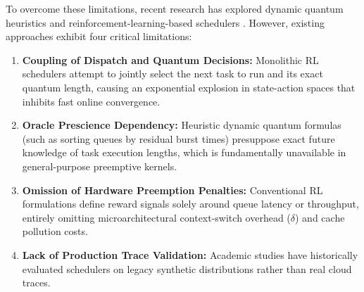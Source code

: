 \documentclass[journal]{IEEEtran}
\begin{document}
To overcome these limitations, recent research has explored dynamic quantum heuristics \cite{hasan2024enhanced, mehmood2023optimizing, ali2023dynamic} and reinforcement-learning-based schedulers \cite{li2024reinforcement, zhang2023deep, chen2023multi, kim2024adaptive}. However, existing approaches exhibit four critical limitations:
\begin{enumerate}
    \item \textbf{Coupling of Dispatch and Quantum Decisions:} Monolithic RL schedulers attempt to jointly select the next task to run and its exact quantum length, causing an exponential explosion in state-action spaces that inhibits fast online convergence.
    \item \textbf{Oracle Prescience Dependency:} Heuristic dynamic quantum formulas (such as sorting queues by residual burst times) presuppose exact future knowledge of task execution lengths, which is fundamentally unavailable in general-purpose preemptive kernels.
    \item \textbf{Omission of Hardware Preemption Penalties:} Conventional RL formulations define reward signals solely around queue latency or throughput, entirely omitting microarchitectural context-switch overhead ($\delta$) and cache pollution costs.
    \item \textbf{Lack of Production Trace Validation:} Academic studies have historically evaluated schedulers on legacy synthetic distributions rather than real cloud traces.
\end{enumerate}
\end{document}
